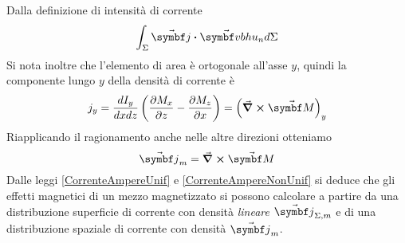 Dalla definizione di intensità di corrente
\begin{equation*}
	\int_{\Sigma}\vba{j}\vdot\vba{vbh}u_nd\Sigma
\end{equation*}
Si nota inoltre che l'elemento di area è ortogonale all'asse $y$, quindi la componente lungo $y$ della densità di corrente è
\begin{equation*}
	j_y=\frac{dI_y}{dxdz}\left(\pdv{M_x}{z}-\pdv{M_z}{x}\right)=\left(\curl{\vba{M}}\right)_y
\end{equation*}
Riapplicando il ragionamento anche nelle altre direzioni otteniamo
\begin{equation}
	\vba{j}_m=\curl{\vba{M}}\label{CorrenteAmpereNonUnif}
\end{equation}
Dalle leggi \eqref{CorrenteAmpereUnif} e \eqref{CorrenteAmpereNonUnif} si deduce che gli effetti magnetici di un mezzo magnetizzato si possono calcolare a partire da una distribuzione superficie di corrente con densità \textit{lineare} $\vba{j}_{\Sigma, m}$ e di una distribuzione spaziale di corrente con densità $\vba{j}_m$.
